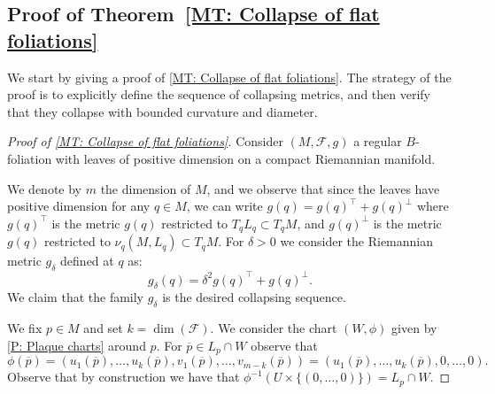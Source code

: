 \documentclass[12pt,a4paper,reqno]{amsart}
\theoremstyle{definition}
\numberwithin{equation}{section}
\newcommand{\fol}{\mathcal{F}}
\begin{document}
\subsection{Proof of Theorem~\ref{MT: Collapse of flat foliations}}\label{SS: Proof of collapse}

We start by giving a proof of \th\ref{MT: Collapse of flat foliations}. The strategy of the proof is to explicitly define the sequence of collapsing metrics, and then verify that they collapse with bounded curvature and diameter.

\begin{proof}[Proof of \th\ref{MT: Collapse of flat foliations}]
Consider $(M,\fol,g)$ a regular $B$-foliation with leaves of positive dimension on a compact Riemannian manifold. 

We denote by $m$ the dimension of $M$, and we observe that since the leaves have positive dimension for any $q\in M$, we can write $g(q) = g(q)^\top+g(q)^\perp$ where $g(q)^\top$ is the metric $g(q)$ restricted to $T_q L_q\subset T_q M$, and $g(q)^\perp$ is the metric $g(q)$ restricted to $\nu_q(M,L_q)\subset T_q M$. For $\delta>0$ we consider the Riemannian metric $g_\delta$ defined at $q$ as:
\begin{equation}\label{EQ: collapsing sequence}
g_\delta(q) = \delta^2 g(q)^\top+g(q)^\perp.
\end{equation}
We claim that the family $g_\delta$ is the desired collapsing sequence.

We fix $p\in M$ and set $k = \dim(\fol)$. We consider the chart $(W,\phi)$ given by \th\ref{P: Plaque charts} around $p$. For $\overline{p}\in L_p\cap W$ observe that 
\[
\phi(\overline{p}) = (u_1(\overline{p}),\ldots,u_{k}(\overline{p}),v_1(\overline{p}),\ldots,v_{m-k}(\overline{p}))= (u_1(\overline{p}),\ldots,u_{k}(\overline{p}),0,\ldots,0).
\] 
Observe that by construction we have that $\phi^{-1}(U\times\{(0,\ldots,0)\}) = L_p\cap W$.


\end{proof}
\end{document}

